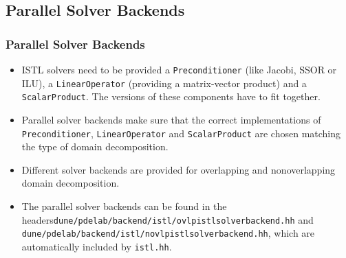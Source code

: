 \documentclass[aspectratio=169,11pt]{beamer}
\theoremstyle{definition}
\begin{document}
\subsection{Parallel Solver Backends}

\begin{frame}
  \frametitle<presentation>{Parallel Solver Backends}

\begin{itemize}
\item ISTL solvers need to be provided a \lstinline!Preconditioner! (like Jacobi, SSOR or ILU), a
\lstinline!LinearOperator! (providing a matrix-vector product) and
a \lstinline!ScalarProduct!. The versions of these components have to fit together.
\item Parallel solver backends make sure that the correct implementations of
\lstinline!Preconditioner!, \lstinline!LinearOperator! and \lstinline!ScalarProduct!
are chosen matching the type of domain decomposition.
\item Different solver backends are provided for overlapping and nonoverlapping domain
decomposition.
\item The parallel solver backends can be found in the headers\newline \lstinline!dune/pdelab/backend/istl/ovlpistlsolverbackend.hh! and \newline
\lstinline!dune/pdelab/backend/istl/novlpistlsolverbackend.hh!,\newline
which are automatically included by \lstinline!istl.hh!.
\end{itemize}

\end{frame}

\end{document}
